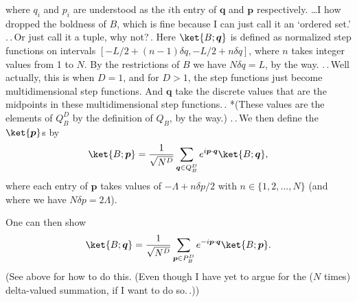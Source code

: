 \documentclass{report}
\begin{document}
where $q_i$ and $p_i$ are understood as the $i$th entry of $\boldsymbol{q}$ and $\boldsymbol{p}$ respectively. \ldots I how dropped the boldness of $B$, which is fine because I can just call it an `ordered set.' .\,.\,Or just call it a tuple, why not?\,. 
Here $\ket{B; \boldsymbol{q}}$ is defined as normalized step functions on intervals $[-L/2 + (n-1) \delta q, -L/2 + n \delta q]$, where $n$ takes integer values from 1 to $N$. By the restrictions of $B$ we have $N \delta q = L$, by the way. .\,.\,Well actually, this is when $D=1$, and for $D>1$, the step functions just become multidimensional step functions. And $\boldsymbol{q}$ take the discrete values that are the midpoints in these multidimensional step functions.\,. *(These values are the elements of $Q_B^D$ by the definition of $Q_B$, by the way.) .\,.\,We then define the $\ket{\boldsymbol{p}}$s by
\begin{align}
\begin{aligned}
	\ket{B; \boldsymbol{p}} = \frac{1}{\sqrt{N^{D}}} \sum_{\boldsymbol{q}\in Q_B^D}
		e^{i \boldsymbol{p} \cdot \boldsymbol{q}} \ket{B; \boldsymbol{q}},
	\label{ket_pB_01}
\end{aligned}
\end{align} 
where each entry of $\boldsymbol{p}$ takes values %
of $-\Lambda + n \delta p/2$ with $n\in \{1, 2,\ldots, N\}$ (and where we have $N \delta p = 2\Lambda$). 

One can then show
\begin{align}
\begin{aligned}
	\ket{B; \boldsymbol{q}} = \frac{1}{\sqrt{N^{D}}} \sum_{\boldsymbol{p}\in P_B^D}
		e^{- i \boldsymbol{p} \cdot \boldsymbol{q}} \ket{B; \boldsymbol{p}}.
	\label{ket_qB_01}
\end{aligned}
\end{align} 
(See above for how to do this. (Even though I have yet to argue for the ($N$ times) delta-valued summation, if I want to do so.\,.)) 
\end{document}
